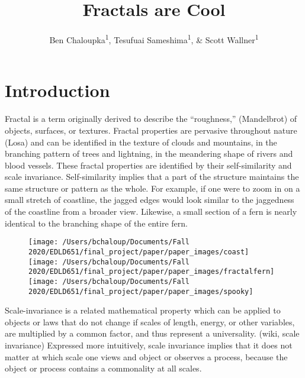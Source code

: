 \documentclass[english,jou]{apa6}
\author{Ben Chaloupka\textsuperscript{1}, Tesufuai Sameshima\textsuperscript{1}, \& Scott Wallner\textsuperscript{1}}
\affiliation{
\vspace{0.5cm}
\textsuperscript{1} University of Oregon}
\title{Fractals are Cool}
\date{}
\begin{document}
\maketitle

\hypertarget{introduction}{%
\section{Introduction}\label{introduction}}

Fractal is a term originally derived to describe the \enquote{roughness,} (Mandelbrot) of objects, surfaces, or textures. Fractal properties are pervasive throughout nature (Losa) and can be identified in the texture of clouds and mountains, in the branching pattern of trees and lightning, in the meandering shape of rivers and blood vessels. These fractal properties are identified by their self-similarity and scale invariance. Self-similarity implies that a part of the structure maintains the same structure or pattern as the whole. For example, if one were to zoom in on a small stretch of coastline, the jagged edges would look similar to the jaggedness of the coastline from a broader view. Likewise, a small section of a fern is nearly identical to the branching shape of the entire fern.

\begin{figure}

\texttt{[image: /Users/bchaloup/Documents/Fall 2020/EDLD651/final\_project/paper/paper\_images/coast]} \texttt{[image: /Users/bchaloup/Documents/Fall 2020/EDLD651/final\_project/paper/paper\_images/fractalfern]} \texttt{[image: /Users/bchaloup/Documents/Fall 2020/EDLD651/final\_project/paper/paper\_images/spooky]} \hfill{}

\caption{ }\label{fig:unnamed-chunk-1}
\end{figure}

Scale-invariance is a related mathematical property which can be applied to objects or laws that do not change if scales of length, energy, or other variables, are multiplied by a common factor, and thus represent a universality. (wiki, scale invariance) Expressed more intuitively, scale invariance implies that it does not matter at which scale one views and object or observes a process, because the object or process contains a commonality at all scales.
\end{document}
